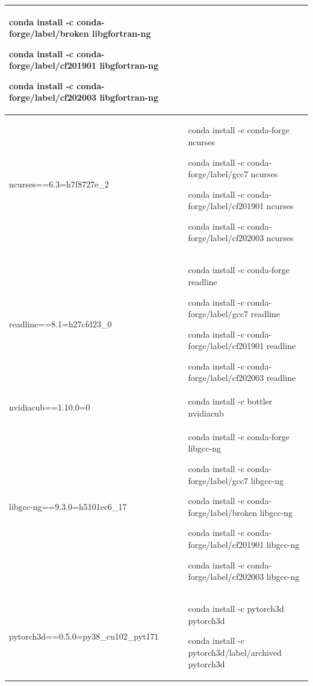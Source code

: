 \begin{table}
\begin{tabular}{ |p{8cm}||p{8cm}|}
	conda install -c conda-forge/label/broken libgfortran-ng

	conda install -c conda-forge/label/cf201901 libgfortran-ng

	conda install -c conda-forge/label/cf202003 libgfortran-ng\\ \hline



ncurses==6.3=h7f8727e\_2  &
	conda install -c conda-forge ncurses

	conda install -c conda-forge/label/gcc7 ncurses

	conda install -c conda-forge/label/cf201901 ncurses

	conda install -c conda-forge/label/cf202003 ncurses\\ \hline



  readline==8.1=h27cfd23\_0 &
	conda install -c conda-forge readline

	conda install -c conda-forge/label/gcc7 readline

	conda install -c conda-forge/label/cf201901 readline

	conda install -c conda-forge/label/cf202003 readline\\ \hline


  
  nvidiacub==1.10.0=0 &	conda install -c bottler nvidiacub\\ \hline



  libgcc-ng==9.3.0=h5101ec6\_17  &
	conda install -c conda-forge libgcc-ng

	conda install -c conda-forge/label/gcc7 libgcc-ng

	conda install -c conda-forge/label/broken libgcc-ng

	conda install -c conda-forge/label/cf201901 libgcc-ng

	conda install -c conda-forge/label/cf202003 libgcc-ng\\ \hline



  pytorch3d==0.5.0=py38\_cu102\_pyt171  &
	conda install -c pytorch3d pytorch3d

	conda install -c pytorch3d/label/archived pytorch3d\\



\end{tabular}
\end{table}
\medskip

